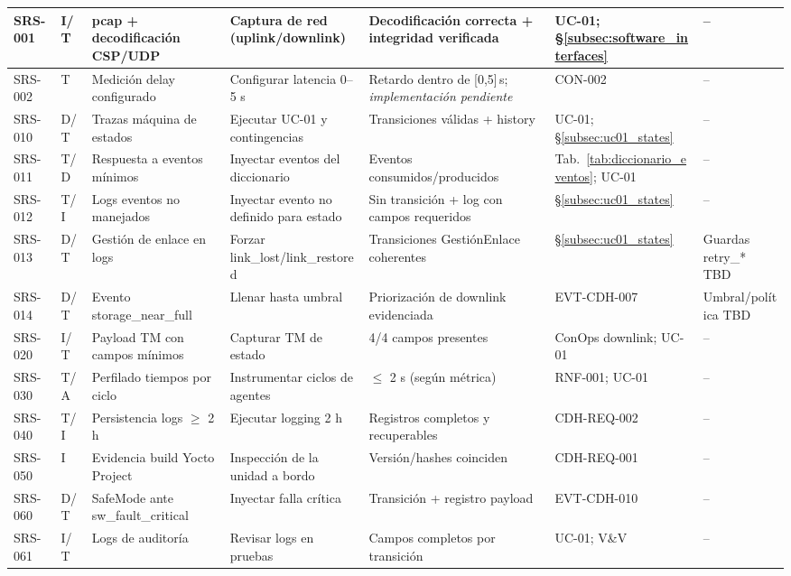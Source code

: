 \begin{landscape}
\begin{longtable}{|p{1.8cm}|p{1.4cm}|p{4.2cm}|p{4.8cm}|p{4.2cm}|p{3.2cm}|p{2.2cm}|}
SRS-001 & I/T & pcap + decodificación CSP/UDP & Captura de red (uplink/downlink) & Decodificación correcta + integridad verificada & UC-01; \S\ref{subsec:software_interfaces} & --\\ \hline
SRS-002 & T & Medición delay configurado & Configurar latencia 0--5 s & Retardo dentro de [0,5]\,s; \emph{implementación pendiente} & CON-002 & --\\ \hline
SRS-010 & D/T & Trazas máquina de estados & Ejecutar UC-01 y contingencias & Transiciones válidas + history & UC-01; \S\ref{subsec:uc01_states} & --\\ \hline
SRS-011 & T/D & Respuesta a eventos mínimos & Inyectar eventos del diccionario & Eventos consumidos/producidos & Tab.~\ref{tab:diccionario_eventos}; UC-01 & --\\ \hline
SRS-012 & T/I & Logs eventos no manejados & Inyectar evento no definido para estado & Sin transición + log con campos requeridos & \S\ref{subsec:uc01_states} & --\\ \hline
SRS-013 & D/T & Gestión de enlace en logs & Forzar link\_lost/link\_restored & Transiciones GestiónEnlace coherentes & \S\ref{subsec:uc01_states} & Guardas retry\_* TBD\\ \hline
SRS-014 & D/T & Evento storage\_near\_full & Llenar hasta umbral & Priorización de downlink evidenciada & EVT-CDH-007 & Umbral/política TBD\\ \hline
SRS-020 & I/T & Payload TM con campos mínimos & Capturar TM de estado & 4/4 campos presentes & ConOps downlink; UC-01 & --\\ \hline
SRS-030 & T/A & Perfilado tiempos por ciclo & Instrumentar ciclos de agentes & $\le$ 2 s (según métrica) & RNF-001; UC-01 & --\\ \hline
SRS-040 & T/I & Persistencia logs $\ge$ 2 h & Ejecutar logging 2 h & Registros completos y recuperables & CDH-REQ-002 & --\\ \hline
SRS-050 & I & Evidencia build Yocto Project & Inspección de la unidad a bordo & Versión/hashes coinciden & CDH-REQ-001 & --\\ \hline
SRS-060 & D/T & SafeMode ante sw\_fault\_critical & Inyectar falla crítica & Transición + registro payload & EVT-CDH-010 & --\\ \hline
SRS-061 & I/T & Logs de auditoría & Revisar logs en pruebas & Campos completos por transición & UC-01; V\&V & --\\ \hline

\end{longtable}
\end{landscape}

